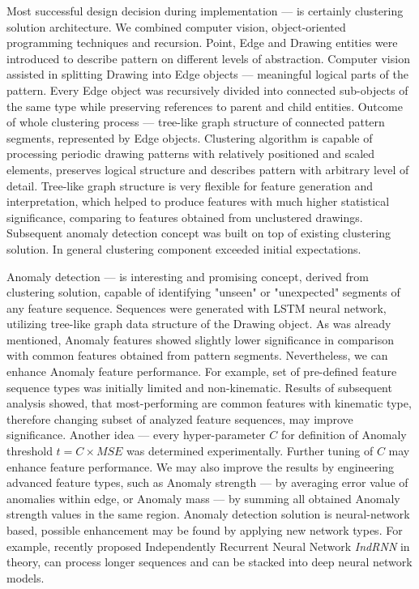 Most successful design decision during implementation --- is certainly clustering solution architecture. We combined computer vision, object-oriented programming techniques and recursion. Point, Edge and Drawing entities were introduced to describe pattern on different levels of abstraction. Computer vision assisted in splitting Drawing into Edge objects --- meaningful logical parts of the pattern. Every Edge object was recursively divided into connected sub-objects of the same type while preserving references to parent and child entities. Outcome of whole clustering process --- tree-like graph structure of connected pattern segments, represented by Edge objects. Clustering algorithm is capable of processing periodic drawing patterns with relatively positioned and scaled elements, preserves logical structure and describes pattern with arbitrary level of detail. Tree-like graph structure is very flexible for feature generation and interpretation, which helped to produce features with much higher statistical significance, comparing to features obtained from unclustered drawings. Subsequent anomaly detection concept was built on top of existing clustering solution. In general clustering component exceeded initial expectations.


Anomaly detection --- is interesting and promising concept, derived from clustering solution, capable of identifying "unseen" or "unexpected" segments of any feature sequence. Sequences were generated with LSTM neural network, utilizing tree-like graph data structure of the Drawing object. As was already mentioned, Anomaly features showed slightly lower significance in comparison with common features obtained from pattern segments. Nevertheless, we can enhance Anomaly feature performance.  For example, set of pre-defined feature sequence types was initially limited and non-kinematic. Results of subsequent analysis showed, that most-performing are common features with kinematic type, therefore changing subset of analyzed feature sequences, may improve significance. Another idea --- every hyper-parameter $C$ for definition of Anomaly threshold $t = C \times MSE$ was determined experimentally. Further tuning of $C$ may enhance feature performance. We may also improve the results by engineering advanced feature types, such as Anomaly strength --- by averaging error value of anomalies within edge, or Anomaly mass --- by summing all obtained Anomaly strength values in the same region. Anomaly detection solution is neural-network based, possible enhancement may be found by applying new network types. For example, recently proposed Independently Recurrent Neural Network \textit{IndRNN} \cite{li2018independently} in theory, can process longer sequences and can be stacked into deep neural network models.


